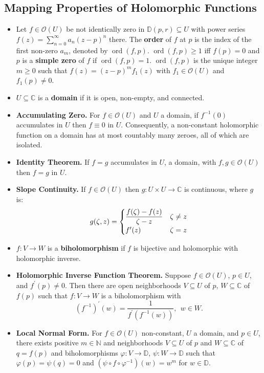 \documentclass{article}
\DeclareMathOperator{\order}{ord}
\newenvironment{topic}[1]{%
{\subsection{#1}}%
\begin{itemize}%
}{%
\end{itemize}%
}
\newcommand{\theorem}[1]{\item {\bf #1.}}
\newcommand{\lemma}[1]{\item {\bf #1.}}
\newcommand{\term}[1]{{\bf #1}}
\newcommand{\holo}[1]{\mathcal{O}(#1)}
\newcommand{\remark}{\item}
\newcommand{\udisk}{\mathbb{D}}
\newcommand{\disk}[2]{\mathbb{D}(#1, #2)}
\begin{document}
\begin{topic}{Mapping Properties of Holomorphic Functions}

\remark Let $f \in \holo{U}$ be not identically zero in $\disk{p}{r} \subseteq U$ with power series $f(z) = \sum_{n=0}^\infty a_n (z - p)^n$ there. The \term{order} of $f$ at $p$ is the index of the first non-zero $a_m$, denoted by $\order(f, p)$. $\order(f, p) \geq 1$ iff $f(p) = 0$ and $p$ is a \term{simple zero} of $f$ if $\order(f, p) = 1$. $\order(f, p)$ is the unique integer $m \geq 0$ such that $f(z) = (z - p)^m f_1(z)$ with $f_1 \in \holo{U}$ and $f_1(p) \neq 0$.

\remark $U \subseteq \mathbb{C}$ is a \term{domain} if it is open, non-empty, and connected.

\lemma{Accumulating Zero} For $f \in \holo{U}$ and $U$ a domain, if $f^{-1}(0)$ accumulates in $U$ then $f \equiv 0$ in $U$. Consequently, a non-constant holomorphic function on a domain has at most countably many zeroes, all of which are isolated.

\theorem{Identity Theorem} If $f = g$ accumulates in $U$, a domain, with $f, g \in \holo{U}$ then $f = g$ in $U$.

\lemma{Slope Continuity} If $f \in \holo{U}$ then $g : U \times U \to \mathbb{C}$ is continuous, where $g$ is: $$\renewcommand{\arraystretch}{1.2}g(\zeta, z) =
\begin{cases}
\dfrac{f(\zeta) - f(z)}{\zeta - z}&\zeta \neq z\\
f^\prime(z)&\zeta = z
\end{cases}\renewcommand{\arraystretch}{1.0}$$

\remark $f : V \to W$ is a \term{biholomorphism} if $f$ is bijective and holomorphic with holomorphic inverse.

\theorem{Holomorphic Inverse Function Theorem} Suppose $f \in \holo{U}$, $p \in U$, and $f^\prime(p) \neq 0$. Then there are open neighborhoods $V \subseteq U$ of $p$, $W \subseteq \mathbb{C}$ of $f(p)$ such that $f : V \to W$ is a biholomorphism with $$\left(f^{-1}\right)^\prime(w) = \dfrac{1}{f^\prime(f^{-1}(w))},~~w \in W.$$

\theorem{Local Normal Form} For $f \in \holo{U}$ non-constant, $U$ a domain, and $p \in U$, there exists positive $m \in \mathbb{N}$ and neighborhoods $V \subseteq U$ of $p$ and $W \subseteq \mathbb{C}$ of $q = f(p)$ and biholomorphisms $\varphi : V \to \udisk$, $\psi : W \to \udisk$ such that $\varphi(p) = \psi(q) = 0$ and $(\psi \circ f \circ \varphi^{-1})(w) = w^m$ for $w \in \udisk$.


\end{topic}
\end{document}
